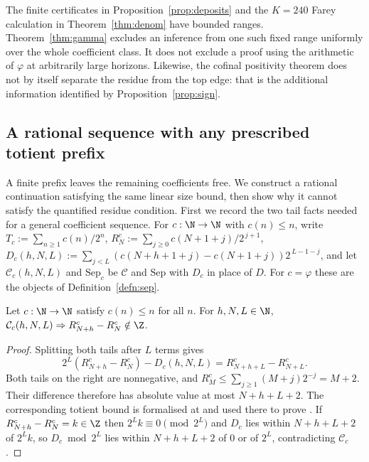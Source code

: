 The finite certificates in Proposition~\ref{prop:deposits} and the $K=240$
Farey calculation in Theorem~\ref{thm:denom} have bounded ranges.
Theorem~\ref{thm:gamma} excludes
an inference from one such fixed range uniformly over the whole coefficient
class. It does not exclude a proof using the arithmetic of $\varphi$ at
arbitrarily large horizons. Likewise, the cofinal positivity theorem does
not by itself separate the residue from the top edge: that is the additional
information identified by Proposition~\ref{prop:sign}.

\subsection{A rational sequence with any prescribed totient prefix}

A finite prefix leaves the remaining coefficients free. We construct a
rational continuation satisfying the same linear size bound, then show why
it cannot satisfy the quantified residue condition. First we record the
two tail facts needed for a general coefficient sequence. For
$c : \N \to \N$ with $c(n) \le n$, write
$T_c := \sum_{n \ge 1} c(n)/2^{n}$,
$R^{c}_{N} := \sum_{j \ge 0} c(N{+}1{+}j)/2^{\,j+1}$,
$D_c(h,N,L) := \sum_{j<L}(c(N{+}h{+}1{+}j) - c(N{+}1{+}j))2^{\,L-1-j}$,
and let $\mathcal C_c(h,N,L)$ and $\mathrm{Sep}_c$ be
$\mathcal{C}$ and $\mathrm{Sep}$ with $D_c$ in place of
${D}$. For $c = \varphi$ these are the objects of
Definition~\ref{defn:sep}.

\begin{lem}
\label{lem:gsound}
Let $c:\N\to\N$ satisfy $c(n)\le n$ for all $n$. For $h,N,L\in\N$,
$\mathcal C_c(h,N,L) \Rightarrow R^{c}_{N+h} - R^{c}_{N} \notin \Z$.
\end{lem}

\begin{proof}
Splitting both tails after $L$ terms gives
\[
 2^L(R^c_{N+h}-R^c_N)-D_c(h,N,L)
   =R^c_{N+h+L}-R^c_{N+L}.
\]
Both tails on the right are nonnegative, and
$R^c_M\le\sum_{j\ge1}(M+j)2^{-j}=M+2$. Their difference therefore has
absolute value at most $N+h+L+2$. The corresponding totient bound is
formalised at
 and used
there to prove
.
If $R^{c}_{N+h} - R^{c}_{N} = k \in \Z$ then $2^{L}k \equiv 0 \pmod{2^{L}}$
and $D_c$ lies within $N{+}h{+}L{+}2$ of $2^{L}k$, so
$D_c \bmod 2^{L}$ lies within $N{+}h{+}L{+}2$ of $0$ or of $2^{L}$,
contradicting $\mathcal C_c$.
\end{proof}

